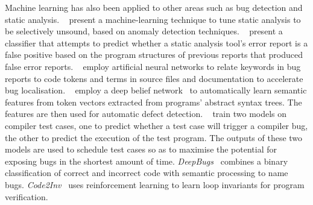 Machine learning has also been applied to other areas such as bug detection and static analysis.
\citeauthor{Heo2017}~\cite{Heo2017} present a machine-learning technique to tune static analysis to be selectively unsound, based on anomaly detection techniques.
\citeauthor{Koc2017}~\cite{Koc2017} present a classifier that attempts to predict whether a static analysis tool's error report is a false positive based on the program structures of previous reports that produced false error reports.
\citeauthor{Lam2016}~\cite{Lam2016} employ artificial neural networks to relate keywords in bug reports to code tokens and terms in source files and documentation to accelerate bug localisation.
\citeauthor{Wang2016c}~\cite{Wang2016c} employ a deep belief network~\cite{Hinton2006a} to automatically learn semantic features from token vectors extracted from programs' abstract syntax trees. The features are then used for automatic defect detection.
\citeauthor{Chen2017}~\cite{Chen2017} train two models on compiler test cases, one to predict whether a test case will trigger a compiler bug, the other to predict the execution of the test program. The outputs of these two models are used to schedule test cases so as to maximise the potential for exposing bugs in the shortest amount of time.
\emph{DeepBugs}~\cite{Pradel2018} combines a binary classification of correct and incorrect code with semantic processing to name bugs.
\emph{Code2Inv}~\cite{Si2018} uses reinforcement learning to learn loop invariants for program verification.

